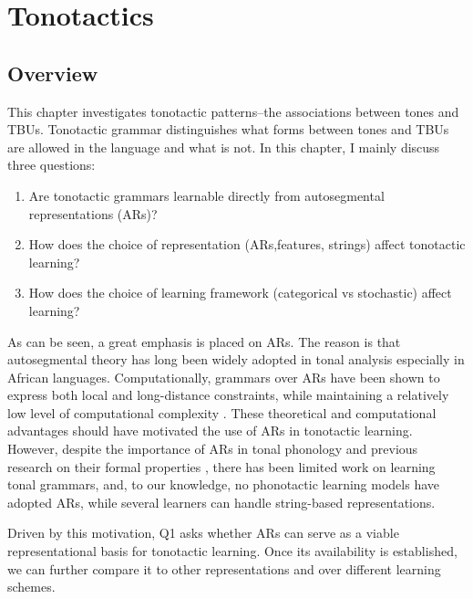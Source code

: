 \chapter{Tonotactics} 
\label{chap:tonotactics}

\section{Overview}\label{sec:intro} 
This chapter investigates tonotactic patterns--the associations between
tones and TBUs. Tonotactic grammar distinguishes what forms between tones and
TBUs are allowed in the language and what is not. In this chapter, I mainly 
discuss three questions:
\begin{enumerate}[label=Q\arabic*., itemsep=0.1em,]
      \item Are tonotactic grammars learnable directly from autosegmental representations (ARs)?
    \item How does the choice of representation (ARs,features, strings) affect tonotactic learning?
    \item How does the choice of learning framework (categorical vs stochastic) affect learning?
\end{enumerate}


As can be seen, a great emphasis is placed on ARs. The reason is that  
autosegmental theory has long been widely adopted in tonal analysis 
especially in African languages. Computationally, grammars over ARs 
have been shown to express both local and long-distance constraints, 
while maintaining a relatively low level of computational complexity 
\citep{jardine2017LocalNature, chandleejardine19aisl}. These theoretical 
and computational advantages should have motivated the use of ARs in 
tonotactic learning. However, despite the importance of ARs in tonal 
phonology and previous research on their formal properties \citep{kornai2007mathematical}, there has been limited work on learning tonal grammars, and, to our knowledge, no phonotactic learning models have 
adopted ARs, while several learners can handle string-based representations.

Driven by this motivation, Q1 asks whether ARs can serve as a viable 
representational basis for tonotactic learning. Once its availability 
is established, we can further compare it to other representations
and over different learning schemes.

